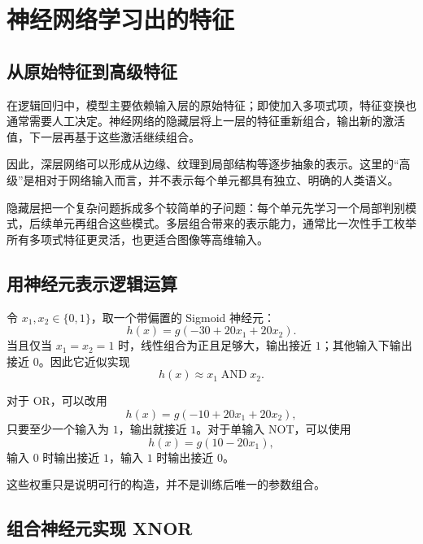 \documentclass[12pt,a4paper]{ctexart}
\begin{document}
\section{神经网络学习出的特征}

\subsection{从原始特征到高级特征}

\begin{definitionbox}[自动学习特征]
在逻辑回归中，模型主要依赖输入层的原始特征；即使加入多项式项，特征变换也通常需要人工决定。神经网络的隐藏层将上一层的特征重新组合，输出新的激活值，下一层再基于这些激活继续组合。

因此，深层网络可以形成从边缘、纹理到局部结构等逐步抽象的表示。这里的“高级”是相对于网络输入而言，并不表示每个单元都具有独立、明确的人类语义。
\end{definitionbox}

\begin{tipbox}[为什么隐藏层有用]
隐藏层把一个复杂问题拆成多个较简单的子问题：每个单元先学习一个局部判别模式，后续单元再组合这些模式。多层组合带来的表示能力，通常比一次性手工枚举所有多项式特征更灵活，也更适合图像等高维输入。
\end{tipbox}

\subsection{用神经元表示逻辑运算}

\begin{examplebox}[AND 运算]
令 $x_1,x_2\in\{0,1\}$，取一个带偏置的 Sigmoid 神经元：
\[
  h(x)=g(-30+20x_1+20x_2).
\]
当且仅当 $x_1=x_2=1$ 时，线性组合为正且足够大，输出接近 $1$；其他输入下输出接近 $0$。因此它近似实现
\[
  h(x)\approx x_1\operatorname{AND}x_2.
\]
\end{examplebox}

\begin{examplebox}[OR 与 NOT 运算]
对于 OR，可以改用
\[
  h(x)=g(-10+20x_1+20x_2),
\]
只要至少一个输入为 $1$，输出就接近 $1$。对于单输入 NOT，可以使用
\[
  h(x)=g(10-20x_1),
\]
输入 $0$ 时输出接近 $1$，输入 $1$ 时输出接近 $0$。

这些权重只是说明可行的构造，并不是训练后唯一的参数组合。
\end{examplebox}

\subsection{组合神经元实现 XNOR}
\end{document}
